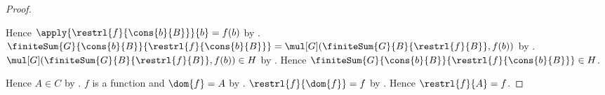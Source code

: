 \begin{proof}
\begin{subproof}
\begin{byCase}
            Hence $\apply{\restrl{f}{\cons{b}{B}}}{b}=f(b)$ by
                .
            $\finiteSum{G}{\cons{b}{B}}{
                    \restrl{f}{\cons{b}{B}}}
                =\mul[G](\finiteSum{G}{B}{\restrl{f}{B}},f(b))$ by
                .
            $\mul[G](\finiteSum{G}{B}{\restrl{f}{B}},f(b))\in H$ by
                .
            Hence $\finiteSum{G}{\cons{b}{B}}{
                \restrl{f}{\cons{b}{B}}}\in H$.
        \end{byCase}
    \end{subproof}
    Hence $A\in C$ by .
    $f$ is a function and $\dom{f}=A$ by
        .
    $\restrl{f}{\dom{f}}=f$ by .
    Hence $\restrl{f}{A}=f$.
\end{proof}
